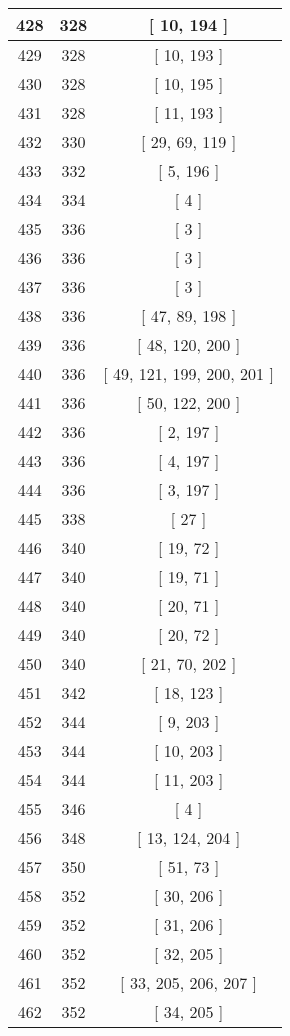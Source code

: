 \begin{center}
\begin{longtable}[H]{|| c c c ||}
\hline
428 & 328 & [ 10, 194 ] \\ 
\hline
429 & 328 & [ 10, 193 ] \\ 
\hline
430 & 328 & [ 10, 195 ] \\ 
\hline
431 & 328 & [ 11, 193 ] \\ 
\hline
432 & 330 & [ 29, 69, 119 ] \\ 
\hline
433 & 332 & [ 5, 196 ] \\ 
\hline
434 & 334 & [ 4 ] \\ 
\hline
435 & 336 & [ 3 ] \\ 
\hline
436 & 336 & [ 3 ] \\ 
\hline
437 & 336 & [ 3 ] \\ 
\hline
438 & 336 & [ 47, 89, 198 ] \\ 
\hline
439 & 336 & [ 48, 120, 200 ] \\ 
\hline
440 & 336 & [ 49, 121, 199, 200, 201 ] \\ 
\hline
441 & 336 & [ 50, 122, 200 ] \\ 
\hline
442 & 336 & [ 2, 197 ] \\ 
\hline
443 & 336 & [ 4, 197 ] \\ 
\hline
444 & 336 & [ 3, 197 ] \\ 
\hline
445 & 338 & [ 27 ] \\ 
\hline
446 & 340 & [ 19, 72 ] \\ 
\hline
447 & 340 & [ 19, 71 ] \\ 
\hline
448 & 340 & [ 20, 71 ] \\ 
\hline
449 & 340 & [ 20, 72 ] \\ 
\hline
450 & 340 & [ 21, 70, 202 ] \\ 
\hline
451 & 342 & [ 18, 123 ] \\ 
\hline
452 & 344 & [ 9, 203 ] \\ 
\hline
453 & 344 & [ 10, 203 ] \\ 
\hline
454 & 344 & [ 11, 203 ] \\ 
\hline
455 & 346 & [ 4 ] \\ 
\hline
456 & 348 & [ 13, 124, 204 ] \\ 
\hline
457 & 350 & [ 51, 73 ] \\ 
\hline
458 & 352 & [ 30, 206 ] \\ 
\hline
459 & 352 & [ 31, 206 ] \\ 
\hline
460 & 352 & [ 32, 205 ] \\ 
\hline
461 & 352 & [ 33, 205, 206, 207 ] \\ 
\hline
462 & 352 & [ 34, 205 ] \\ 

\end{longtable}
\end{center}
